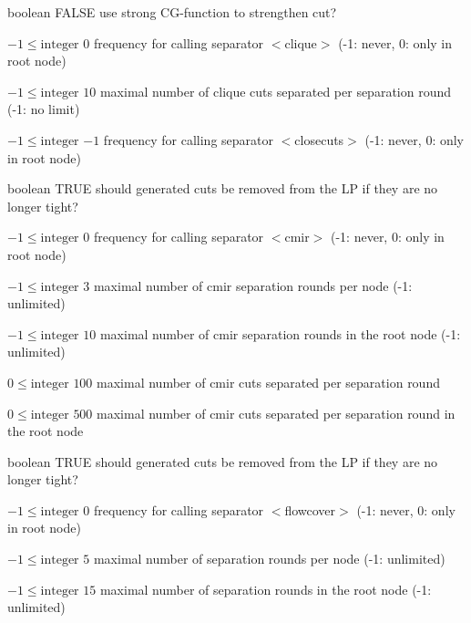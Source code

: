 %
{boolean}%
{FALSE}%
{use strong CG-function to strengthen cut?}%
{}

%
{$-1\leq\textrm{integer}$}%
{$0$}%
{frequency for calling separator $<$clique$>$ (-1: never, 0: only in root node)}%
{}

%
{$-1\leq\textrm{integer}$}%
{$10$}%
{maximal number of clique cuts separated per separation round (-1: no limit)}%
{}

%
{$-1\leq\textrm{integer}$}%
{$-1$}%
{frequency for calling separator $<$closecuts$>$ (-1: never, 0: only in root node)}%
{}

%
{boolean}%
{TRUE}%
{should generated cuts be removed from the LP if they are no longer tight?}%
{}

%
{$-1\leq\textrm{integer}$}%
{$0$}%
{frequency for calling separator $<$cmir$>$ (-1: never, 0: only in root node)}%
{}

%
{$-1\leq\textrm{integer}$}%
{$3$}%
{maximal number of cmir separation rounds per node (-1: unlimited)}%
{}

%
{$-1\leq\textrm{integer}$}%
{$10$}%
{maximal number of cmir separation rounds in the root node (-1: unlimited)}%
{}

%
{$0\leq\textrm{integer}$}%
{$100$}%
{maximal number of cmir cuts separated per separation round}%
{}

%
{$0\leq\textrm{integer}$}%
{$500$}%
{maximal number of cmir cuts separated per separation round in the root node}%
{}

%
{boolean}%
{TRUE}%
{should generated cuts be removed from the LP if they are no longer tight?}%
{}

%
{$-1\leq\textrm{integer}$}%
{$0$}%
{frequency for calling separator $<$flowcover$>$ (-1: never, 0: only in root node)}%
{}

%
{$-1\leq\textrm{integer}$}%
{$5$}%
{maximal number of separation rounds per node (-1: unlimited)}%
{}

%
{$-1\leq\textrm{integer}$}%
{$15$}%
{maximal number of separation rounds in the root node (-1: unlimited)}%
{}

